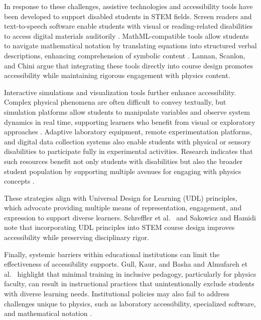 \documentclass[]{aastex701}
\begin{document}
In response to these challenges, assistive technologies and accessibility tools have been developed to support disabled students in STEM fields. Screen readers and text-to-speech software enable students with visual or reading-related disabilities to access digital materials auditorily \citep{Wattanakasiwich2025, Alenezi2025}. MathML-compatible tools allow students to navigate mathematical notation by translating equations into structured verbal descriptions, enhancing comprehension of symbolic content \citep{Wattanakasiwich2025, Alenezi2025}. Lannan, Scanlon, and Chini \citep{Lannan2019} argue that integrating these tools directly into course design promotes accessibility while maintaining rigorous engagement with physics content.

Interactive simulations and visualization tools further enhance accessibility. Complex physical phenomena are often difficult to convey textually, but simulation platforms allow students to manipulate variables and observe system dynamics in real time, supporting learners who benefit from visual or exploratory approaches \citep{Wattanakasiwich2025, Alenezi2025, Lannan2019}. Adaptive laboratory equipment, remote experimentation platforms, and digital data collection systems also enable students with physical or sensory disabilities to participate fully in experimental activities. Research indicates that such resources benefit not only students with disabilities but also the broader student population by supporting multiple avenues for engaging with physics concepts \citep{Wattanakasiwich2025, Alenezi2025, Lannan2019}.

These strategies align with Universal Design for Learning (UDL) principles, which advocate providing multiple means of representation, engagement, and expression to support diverse learners. Schreffler et al.\ \citep{Schreffler2019} and Sakowicz and Hamidi \citep{Sakowicz2025} note that incorporating UDL principles into STEM course design improves accessibility while preserving disciplinary rigor.

Finally, systemic barriers within educational institutions can limit the effectiveness of accessibility supports. Gull, Kaur, and Basha \citep{Gull2025} and Almufareh et al.\ \citep{Almufareh2025} highlight that minimal training in inclusive pedagogy, particularly for physics faculty, can result in instructional practices that unintentionally exclude students with diverse learning needs. Institutional policies may also fail to address challenges unique to physics, such as laboratory accessibility, specialized software, and mathematical notation \citep{Gull2025, Almufareh2025}.
\end{document}
